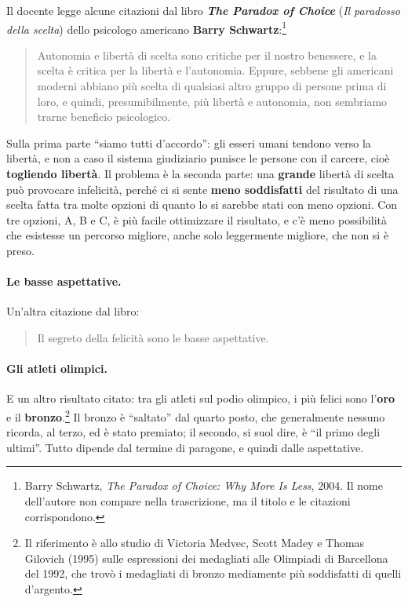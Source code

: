 Il docente legge alcune citazioni dal libro \textbf{\emph{The Paradox of
Choice}} (\emph{Il paradosso della scelta}) dello psicologo americano
\textbf{Barry Schwartz}:\footnote{Barry Schwartz, \emph{The Paradox of
Choice: Why More Is Less}, 2004. Il nome dell'autore non compare nella
trascrizione, ma il titolo e le citazioni corrispondono.}
\begin{quote}
  Autonomia e libertà di scelta sono critiche per il nostro benessere, e la
  scelta è critica per la libertà e l'autonomia. Eppure, sebbene gli
  americani moderni abbiano più scelta di qualsiasi altro gruppo di persone
  prima di loro, e quindi, presumibilmente, più libertà e autonomia, non
  sembriamo trarne beneficio psicologico.
\end{quote}
Sulla prima parte ``siamo tutti d'accordo'': gli esseri umani tendono verso
la libertà, e non a caso il sistema giudiziario punisce le persone con il
carcere, cioè \textbf{togliendo libertà}. Il problema è la seconda parte:
una \textbf{grande} libertà di scelta può provocare infelicità, perché ci si
sente \textbf{meno soddisfatti} del risultato di una scelta fatta tra molte
opzioni di quanto lo si sarebbe stati con meno opzioni. Con tre opzioni,
A, B e C, è più facile ottimizzare il risultato, e c'è meno possibilità che
esistesse un percorso migliore, anche solo leggermente migliore, che non si
è preso.

\paragraph{Le basse aspettative.} Un'altra citazione dal libro:
\begin{quote}
  Il segreto della felicità sono le basse aspettative.
\end{quote}

\paragraph{Gli atleti olimpici.} E un altro risultato citato: tra gli atleti
sul podio olimpico, i più felici sono l'\textbf{oro} e il
\textbf{bronzo}.\footnote{Il riferimento è allo studio di Victoria Medvec,
Scott Madey e Thomas Gilovich (1995) sulle espressioni dei medagliati alle
Olimpiadi di Barcellona del 1992, che trovò i medagliati di bronzo
mediamente più soddisfatti di quelli d'argento.} Il bronzo è ``saltato'' dal
quarto posto, che generalmente nessuno ricorda, al terzo, ed è stato
premiato; il secondo, si suol dire, è ``il primo degli ultimi''. Tutto
dipende dal termine di paragone, e quindi dalle aspettative.

